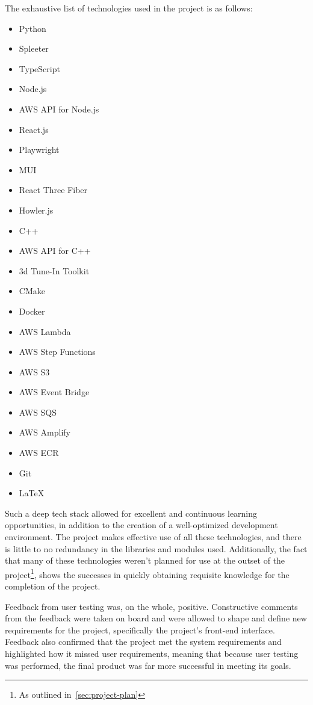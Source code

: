 The exhaustive list of technologies used in the project is as follows:

\begin{itemize}
    \item Python
    \item Spleeter
    \item TypeScript
    \item Node.js
    \item AWS API for Node.js
    \item React.js
    \item Playwright
    \item MUI
    \item React Three Fiber
    \item Howler.js
    \item C++
    \item AWS API for C++
    \item 3d Tune-In Toolkit
    \item CMake
    \item Docker
    \item AWS Lambda
    \item AWS Step Functions
    \item AWS S3
    \item AWS Event Bridge
    \item AWS SQS
    \item AWS Amplify
    \item AWS ECR
    \item Git
    \item LaTeX
\end{itemize}

Such a deep tech stack
allowed for excellent and continuous learning opportunities,
in addition to the creation of a well-optimized development environment.
The project makes effective use of all these technologies,
and there is little to no redundancy in the libraries and modules used.
Additionally,
the fact
that many of these technologies weren't planned for use at the outset of the project\footnote{As outlined in~\ref{sec:project-plan}},
shows the successes in quickly obtaining requisite knowledge for the completion of the project.

Feedback from user testing was, on the whole, positive.
Constructive comments from the feedback were taken on board
and were allowed to shape and define new requirements for the project, specifically the project's front-end interface.
Feedback also confirmed that the project met the system requirements and highlighted how it missed user requirements,
meaning that because user testing was performed, the final product was far more successful in meeting its goals.

